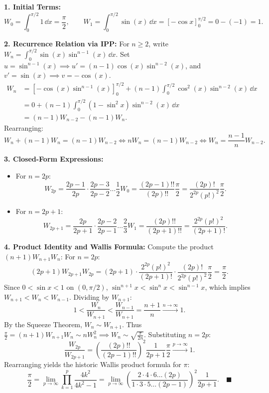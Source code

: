 \begin{solution}
\textbf{1. Initial Terms:}
\[
W_0 = \int_0^{\pi/2} 1\,\dd x = \frac{\pi}{2}, \qquad W_1 = \int_0^{\pi/2} \sin(x)\,\dd x = [-\cos x]_0^{\pi/2} = 0 - (-1) = 1.
\]

\textbf{2. Recurrence Relation via IPP:}
For $n \ge 2$, write $W_n = \int_0^{\pi/2} \sin(x) \sin^{n-1}(x)\,\dd x$.
Set $u = \sin^{n-1}(x) \implies u' = (n - 1)\cos(x)\sin^{n-2}(x)$, and $v' = \sin(x) \implies v = -\cos(x)$.
\begin{align*}
W_n &= [-\cos(x)\sin^{n-1}(x)]_0^{\pi/2} + (n - 1)\int_0^{\pi/2} \cos^2(x)\sin^{n-2}(x)\,\dd x \\
&= 0 + (n - 1)\int_0^{\pi/2} (1 - \sin^2 x)\sin^{n-2}(x)\,\dd x \\
&= (n - 1) W_{n-2} - (n - 1) W_n.
\end{align*}
Rearranging:
\[
W_n + (n - 1)W_n = (n - 1)W_{n-2} \iff n W_n = (n - 1)W_{n-2} \iff W_n = \frac{n - 1}{n} W_{n-2}.
\]

\textbf{3. Closed-Form Expressions:}
\begin{itemize}[leftmargin=1.5em,itemsep=2pt]
  \item For $n = 2p$:
  \[
  W_{2p} = \frac{2p - 1}{2p} \cdot \frac{2p - 3}{2p - 2} \dots \frac{1}{2} W_0 = \frac{(2p - 1)!!}{(2p)!!} \frac{\pi}{2} = \frac{(2p)!}{2^{2p} (p!)^2} \frac{\pi}{2}.
  \]
  \item For $n = 2p + 1$:
  \[
  W_{2p+1} = \frac{2p}{2p + 1} \cdot \frac{2p - 2}{2p - 1} \dots \frac{2}{3} W_1 = \frac{(2p)!!}{(2p + 1)!!} = \frac{2^{2p} (p!)^2}{(2p + 1)!}.
  \]
\end{itemize}

\textbf{4. Product Identity and Wallis Formula:}
Compute the product $(n + 1) W_{n+1} W_n$:
For $n = 2p$:
\[
(2p + 1) W_{2p+1} W_{2p} = (2p + 1) \cdot \frac{2^{2p}(p!)^2}{(2p + 1)!} \cdot \frac{(2p)!}{2^{2p}(p!)^2}\frac{\pi}{2} = \frac{\pi}{2}.
\]
Since $0 < \sin x < 1$ on $(0, \pi/2)$, $\sin^{n+1} x < \sin^n x < \sin^{n-1} x$, which implies $W_{n+1} < W_n < W_{n-1}$.
Dividing by $W_{n+1}$:
\[
1 < \frac{W_n}{W_{n+1}} < \frac{W_{n-1}}{W_{n+1}} = \frac{n + 1}{n} \xrightarrow{n \to \infty} 1.
\]
By the Squeeze Theorem, $W_n \sim W_{n+1}$.
Thus $\frac{\pi}{2} = (n + 1)W_{n+1} W_n \sim n W_n^2 \implies W_n \sim \sqrt{\frac{\pi}{2n}}$.
Substituting $n = 2p$:
\[
\frac{W_{2p}}{W_{2p+1}} = \left( \frac{(2p)!!}{(2p - 1)!!} \right)^2 \frac{1}{2p + 1}\frac{\pi}{2} \xrightarrow{p \to \infty} 1.
\]
Rearranging yields the historic Wallis product formula for $\pi$:
\[
\frac{\pi}{2} = \lim_{p \to \infty} \prod_{k=1}^p \frac{4k^2}{4k^2 - 1} = \lim_{p \to \infty} \left( \frac{2 \cdot 4 \cdot 6 \dots (2p)}{1 \cdot 3 \cdot 5 \dots (2p - 1)} \right)^2 \frac{1}{2p + 1}. \quad \blacksquare
\]
\end{solution}

